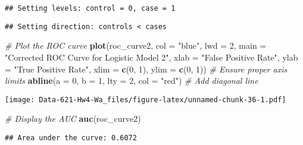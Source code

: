 \documentclass[
]{article}
\newenvironment{Shaded}{\begin{snugshade}}{\end{snugshade}}
\newcommand{\AttributeTok}[1]{\textcolor[rgb]{0.13,0.29,0.53}{#1}}
\newcommand{\CommentTok}[1]{\textcolor[rgb]{0.56,0.35,0.01}{\textit{#1}}}
\newcommand{\DecValTok}[1]{\textcolor[rgb]{0.00,0.00,0.81}{#1}}
\newcommand{\FunctionTok}[1]{\textcolor[rgb]{0.13,0.29,0.53}{\textbf{#1}}}
\newcommand{\NormalTok}[1]{#1}
\newcommand{\StringTok}[1]{\textcolor[rgb]{0.31,0.60,0.02}{#1}}
\begin{document}
\begin{verbatim}
## Setting levels: control = 0, case = 1
\end{verbatim}

\begin{verbatim}
## Setting direction: controls < cases
\end{verbatim}

\begin{Shaded}
\begin{Highlighting}[]
\CommentTok{\# Plot the ROC curve}
\FunctionTok{plot}\NormalTok{(roc\_curve2, }\AttributeTok{col =} \StringTok{"blue"}\NormalTok{, }\AttributeTok{lwd =} \DecValTok{2}\NormalTok{, }
     \AttributeTok{main =} \StringTok{"Corrected ROC Curve for Logistic Model 2"}\NormalTok{,}
     \AttributeTok{xlab =} \StringTok{"False Positive Rate"}\NormalTok{, }\AttributeTok{ylab =} \StringTok{"True Positive Rate"}\NormalTok{, }
     \AttributeTok{xlim =} \FunctionTok{c}\NormalTok{(}\DecValTok{0}\NormalTok{, }\DecValTok{1}\NormalTok{), }\AttributeTok{ylim =} \FunctionTok{c}\NormalTok{(}\DecValTok{0}\NormalTok{, }\DecValTok{1}\NormalTok{))  }\CommentTok{\# Ensure proper axis limits}
\FunctionTok{abline}\NormalTok{(}\AttributeTok{a =} \DecValTok{0}\NormalTok{, }\AttributeTok{b =} \DecValTok{1}\NormalTok{, }\AttributeTok{lty =} \DecValTok{2}\NormalTok{, }\AttributeTok{col =} \StringTok{"red"}\NormalTok{)  }\CommentTok{\# Add diagonal line}
\end{Highlighting}
\end{Shaded}

\texttt{[image: Data-621-Hw4-Wa\_files/figure-latex/unnamed-chunk-36-1.pdf]}

\begin{Shaded}
\begin{Highlighting}[]
\CommentTok{\# Display the AUC}
\FunctionTok{auc}\NormalTok{(roc\_curve2)}
\end{Highlighting}
\end{Shaded}

\begin{verbatim}
## Area under the curve: 0.6072
\end{verbatim}
\end{document}
